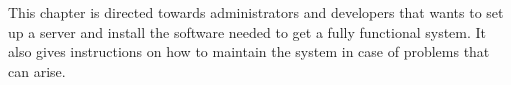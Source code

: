 
This chapter is directed towards administrators and developers that wants to set up a server and install the software needed to get a fully functional system. It also gives instructions on how to maintain the system in case of problems that can arise.




